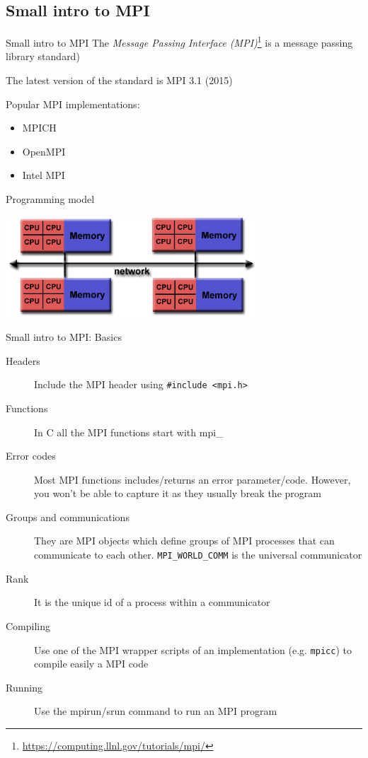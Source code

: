 \documentclass[10pt,xcolor=table]{beamer}
\begin{document}
\subsection{Small intro to MPI}

\begin{frame}{Small intro to MPI}
The \emph{Message Passing Interface (MPI)}\footnote{\url{https://computing.llnl.gov/tutorials/mpi/}}  is a  message passing library standard)

The latest version of the standard is MPI 3.1 (2015)

Popular MPI implementations:
\begin{itemize}
    \item MPICH
    \item OpenMPI
    \item Intel MPI
\end{itemize}

Programming model

\centering
\includegraphics[width=0.7\textwidth]{figs/hybrid_mem.png}
\end{frame}

\begin{frame}{Small intro to MPI: Basics}
\begin{description}
\item[Headers] Include the MPI header using {\tt \#include <mpi.h>}
\item[Functions] In C all the MPI functions start with mpi\_
\item[Error codes] Most MPI functions includes/returns an error parameter/code. However, you won't be able to capture it as they usually break the program
\item[Groups and communications] They are MPI objects which define groups of MPI processes that can communicate to each other. {\tt MPI\_WORLD\_COMM} is the universal communicator
\item[Rank] It is the unique id of a process within a communicator
\item[Compiling] Use one of the MPI wrapper scripts of an implementation (e.g. {\tt mpicc}) to compile easily a MPI code
\item[Running] Use the mpirun/srun command to run an MPI program
\end{description}
\end{frame}
\end{document}
